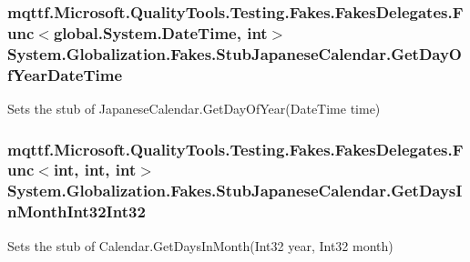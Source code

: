 \hypertarget{class_system_1_1_globalization_1_1_fakes_1_1_stub_japanese_calendar_a55b445417b890df6a1eba0dd795aa75a}{
\subsubsection[{Get\-Day\-Of\-Year\-Date\-Time}]{\setlength{\rightskip}{0pt plus 5cm}mqttf.\-Microsoft.\-Quality\-Tools.\-Testing.\-Fakes.\-Fakes\-Delegates.\-Func$<$global.\-System.\-Date\-Time, int$>$ System.\-Globalization.\-Fakes.\-Stub\-Japanese\-Calendar.\-Get\-Day\-Of\-Year\-Date\-Time}}\label{class_system_1_1_globalization_1_1_fakes_1_1_stub_japanese_calendar_a55b445417b890df6a1eba0dd795aa75a}


Sets the stub of Japanese\-Calendar.\-Get\-Day\-Of\-Year(\-Date\-Time time)

\hypertarget{class_system_1_1_globalization_1_1_fakes_1_1_stub_japanese_calendar_a9f283dd7af2a417a77373193bb23ff4e}{
\subsubsection[{Get\-Days\-In\-Month\-Int32\-Int32}]{\setlength{\rightskip}{0pt plus 5cm}mqttf.\-Microsoft.\-Quality\-Tools.\-Testing.\-Fakes.\-Fakes\-Delegates.\-Func$<$int, int, int$>$ System.\-Globalization.\-Fakes.\-Stub\-Japanese\-Calendar.\-Get\-Days\-In\-Month\-Int32\-Int32}}\label{class_system_1_1_globalization_1_1_fakes_1_1_stub_japanese_calendar_a9f283dd7af2a417a77373193bb23ff4e}


Sets the stub of Calendar.\-Get\-Days\-In\-Month(\-Int32 year, Int32 month)

